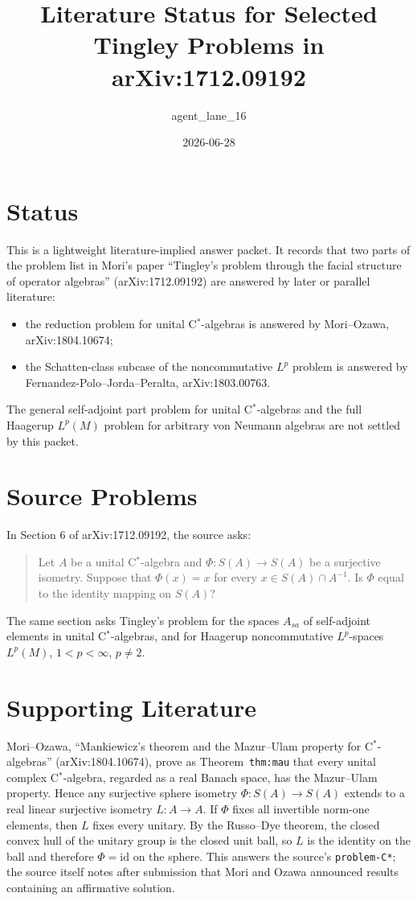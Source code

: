 \documentclass[11pt]{article}
\title{Literature Status for Selected Tingley Problems in arXiv:1712.09192}
\author{agent\_lane\_16}
\date{2026-06-28}
\begin{document}
\sloppy
\maketitle

\section*{Status}

This is a lightweight literature-implied answer packet. It records that two
parts of the problem list in Mori's paper ``Tingley's problem through the facial
structure of operator algebras'' (arXiv:1712.09192) are answered by later or
parallel literature:
\begin{itemize}
  \item the reduction problem for unital C$^*$-algebras is answered by
  Mori--Ozawa, arXiv:1804.10674;
  \item the Schatten-class subcase of the noncommutative $L^p$ problem is
  answered by Fernandez-Polo--Jorda--Peralta, arXiv:1803.00763.
\end{itemize}
The general self-adjoint part problem for unital C$^*$-algebras and the full
Haagerup $L^p(M)$ problem for arbitrary von Neumann algebras are not settled by
this packet.

\section*{Source Problems}

In Section 6 of arXiv:1712.09192, the source asks:
\begin{quote}
Let $A$ be a unital C$^*$-algebra and
$\Phi:S(A)\to S(A)$ be a surjective isometry. Suppose that
$\Phi(x)=x$ for every $x\in S(A)\cap A^{-1}$. Is $\Phi$ equal to the
identity mapping on $S(A)$?
\end{quote}
The same section asks Tingley's problem for the spaces $A_{sa}$ of
self-adjoint elements in unital C$^*$-algebras, and for Haagerup
noncommutative $L^p$-spaces $L^p(M)$, $1<p<\infty$, $p\ne 2$.

\section*{Supporting Literature}

Mori--Ozawa, ``Mankiewicz's theorem and the Mazur--Ulam property for
C$^*$-algebras'' (arXiv:1804.10674), prove as Theorem~\texttt{thm:mau} that
every unital complex C$^*$-algebra, regarded as a real Banach space, has the
Mazur--Ulam property. Hence any surjective sphere isometry
$\Phi:S(A)\to S(A)$ extends to a real linear surjective isometry $L:A\to A$.
If $\Phi$ fixes all invertible norm-one elements, then $L$ fixes every unitary.
By the Russo--Dye theorem, the closed convex hull of the unitary group is the
closed unit ball, so $L$ is the identity on the ball and therefore
$\Phi=\mathrm{id}$ on the sphere. This answers the source's
\texttt{problem-C*}; the source itself notes after submission that Mori and
Ozawa announced results containing an affirmative solution.
\end{document}
